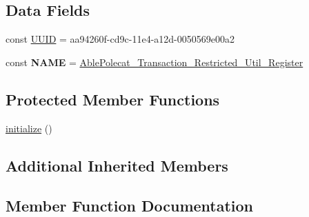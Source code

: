 \subsection*{Data Fields}
\begin{DoxyCompactItemize}
\item 
const \hyperlink{class_able_polecat___transaction___restricted___util___register_a74b892c8c0b86bf9d04c5819898c51e7}{U\+U\+I\+D} = \textquotesingle{}aa94260f-\/cd9c-\/11e4-\/a12d-\/0050569e00a2\textquotesingle{}
\item 
\hypertarget{class_able_polecat___transaction___restricted___util___register_a244352f035b82b20b0efa506167fd862}{}const {\bfseries N\+A\+M\+E} = \textquotesingle{}\hyperlink{class_able_polecat___transaction___restricted___util___register}{Able\+Polecat\+\_\+\+Transaction\+\_\+\+Restricted\+\_\+\+Util\+\_\+\+Register}\textquotesingle{}\label{class_able_polecat___transaction___restricted___util___register_a244352f035b82b20b0efa506167fd862}

\end{DoxyCompactItemize}
\subsection*{Protected Member Functions}
\begin{DoxyCompactItemize}
\item 
\hyperlink{class_able_polecat___transaction___restricted___util___register_a91098fa7d1917ce4833f284bbef12627}{initialize} ()
\end{DoxyCompactItemize}
\subsection*{Additional Inherited Members}


\subsection{Member Function Documentation}
\hypertarget{class_able_polecat___transaction___restricted___util___register_abd12d28cbfdd5a45fba85bbac51a0b12}{}
